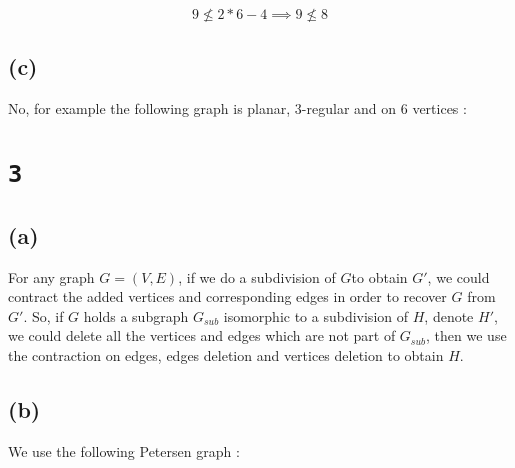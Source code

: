 \documentclass[a4paper,11pt]{report}
\begin{document}
\[
  9 \not\leq 2 * 6 - 4 \implies 9 \not\leq 8
\]

\subsection*{(c)}

No, for example the following graph is planar, $3$-regular and on $6$ vertices :

\begin{center}
\end{center}

\section*{\texttt{3}}

\subsection*{(a)}

For any graph $G=(V,E)$, if we do a subdivision of $G$to obtain $G'$, we could
contract the added vertices and corresponding edges in order to recover $G$ from
$G'$. So, if $G$ holds a subgraph $G_{sub}$ isomorphic to a subdivision of $H$, denote
$H'$, we could delete all the vertices and edges which are not part of
$G_{sub}$, then we use the contraction on edges, edges deletion and vertices
deletion to obtain $H$.

\subsection*{(b)}

We use the following Petersen graph :

\begin{center}
\end{center}
\end{document}

